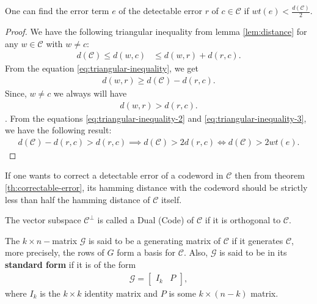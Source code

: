 \begin{theorem}\cite{gallian2024contemporary}\label{th:correctable-error}
  One can find the error term $e$ of the detectable error $r$ of $c\in\mathcal{C}$ if 
  $wt(e)<\frac{d(\mathcal{C})}{2}$.
\end{theorem}
\begin{proof}
  We have the following triangular inequality from lemma \ref{lem:distance} for any $w\in\mathcal{C}$ with 
  $w\neq c$:
  \begin{align}\label{eq:triangular-inequality}
    d(\mathcal{C})\leq d(w,c)&\leq d(w,r)+d(r,c).
  \end{align}
  From the equation \eqref{eq:triangular-inequality}, we get 
  \begin{align}\label{eq:triangular-inequality-2}
    d(w,r)\geq d(\mathcal{C})-d(r,c).
  \end{align} 
  Since, $w\neq c$ we always will have 
  \begin{align}\label{eq:triangular-inequality-3}
    d(w,r)>d(r,c).
  \end{align}. 
  From the equations \eqref{eq:triangular-inequality-2} and \eqref{eq:triangular-inequality-3}, we have the 
  following result:
  \begin{align*}
    d(\mathcal{C})-d(r,c)>d(r,c) \implies d(\mathcal{C})>2d(r,c) \iff d(\mathcal{C})>2wt(e).
  \end{align*}
\end{proof}

If one wants to correct a detectable error of a codeword in $\mathcal{C}$ then from theorem 
\ref{th:correctable-error}, its hamming distance with the codeword should be strictly less than half 
the hamming distance of $\mathcal{C}$ itself.

\begin{definition}
  The vector subspace $\mathcal{C}^{\perp}$ is called a Dual (Code) of $\mathcal{C}$ if it is 
  orthogonal to $\mathcal{C}$.
\end{definition}

\begin{definition}
  The $k\times n-$matrix $\mathcal{G}$ is said to be a generating matrix of $\mathcal{C}$ if it 
  generates $\mathcal{C}$, more precisely, the rows of $G$ form a basis for $\mathcal{C}$. Also, $\mathcal{G}$ is said to be in its 
  \textbf{standard form} if it is of the form
  \begin{align*}
    \mathcal{G} = \begin{bmatrix}
      I_k & P
    \end{bmatrix},
  \end{align*}
  where $I_k$ is the $k\times k$ identity matrix and $P$ is some $k\times (n-k)$ matrix.
\end{definition}


